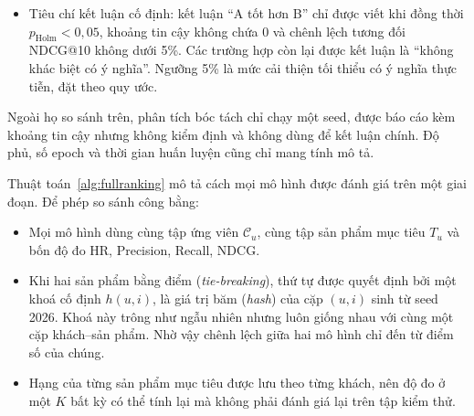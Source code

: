 \begin{itemize}
    \begin{itemize}
        \item Từng cặp mô hình được so sánh bằng kiểm định dấu hạng Wilcoxon ghép cặp theo người dùng \parencite{wilcoxon1945} và khoảng tin cậy 95\% của hiệu trung bình bằng bootstrap ghép cặp với 10.000 lần lấy mẫu lại \parencite{efron1993bootstrap}.
        \item Giá trị $p$ được hiệu chỉnh Holm \parencite{holm1979} trên một họ (\textit{family}) gồm 10 phép so sánh đăng ký trước. Các phép so sánh trong họ được kiểm định cùng nhau và hiệu chỉnh chung.
        \item Chín so sánh đầu đặt NeuMF-F cạnh chín mô hình: NeuMF, GMF-F, MLP-F, LateFusion-F, BPR-MF, ItemKNN, UserKNN, Content và MostPopular-Recent. So sánh với NeuMF đo lợi ích của đặc trưng, với GMF-F và MLP-F đo lợi ích của việc ghép hai nhánh, với LateFusion-F đặt hợp nhất sớm cạnh hợp nhất muộn.
        \item So sánh thứ mười đặt mô hình lai chỉ dùng ID (NeuMF) cạnh MF (BPR-MF).
    \end{itemize}
    \item Tiêu chí kết luận cố định: kết luận ``A tốt hơn B'' chỉ được viết khi đồng thời $p_{\text{Holm}} < 0{,}05$, khoảng tin cậy không chứa 0 và chênh lệch tương đối NDCG@10 không dưới 5\%. Các trường hợp còn lại được kết luận là ``không khác biệt có ý nghĩa''. Ngưỡng 5\% là mức cải thiện tối thiểu có ý nghĩa thực tiễn, đặt theo quy ước.
\end{itemize}

Ngoài họ so sánh trên, phân tích bóc tách chỉ chạy một seed, được báo cáo kèm khoảng tin cậy nhưng không kiểm định và không dùng để kết luận chính. Độ phủ, số epoch và thời gian huấn luyện cũng chỉ mang tính mô tả.

Thuật toán~\ref{alg:fullranking} mô tả cách mọi mô hình được đánh giá trên một giai đoạn. Để phép so sánh công bằng:
\begin{itemize}
    \item Mọi mô hình dùng cùng tập ứng viên $\mathcal{C}_u$, cùng tập sản phẩm mục tiêu $T_u$ và bốn độ đo HR, Precision, Recall, NDCG.
    \item Khi hai sản phẩm bằng điểm (\textit{tie-breaking}), thứ tự được quyết định bởi một khoá cố định $h(u, i)$, là giá trị băm (\textit{hash}) của cặp $(u, i)$ sinh từ seed 2026. Khoá này trông như ngẫu nhiên nhưng luôn giống nhau với cùng một cặp khách--sản phẩm. Nhờ vậy chênh lệch giữa hai mô hình chỉ đến từ điểm số của chúng.
    \item Hạng của từng sản phẩm mục tiêu được lưu theo từng khách, nên độ đo ở một $K$ bất kỳ có thể tính lại mà không phải đánh giá lại trên tập kiểm thử.
\end{itemize}

